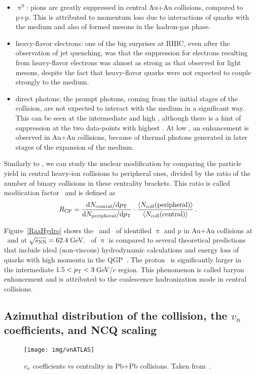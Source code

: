 \begin{itemize}
 \item $\uppi^0$: pions are greatly suppressed in central Au+Au collisions, compared to p+p. This is attributed to momentum loss due to interactions of quarks with the medium and also of formed mesons in the hadron-gas phase.
 \item heavy-flavor electrons: one of the big surprises at RHIC, even after the observation of jet
quenching, was that the suppression for electrons resulting from heavy-flavor electrons was almost as strong as that observed
for light mesons, despite the fact that heavy-flavor quarks were not expected to couple
strongly to the medium.
 \item direct photons: the prompt photons, coming from the initial stages of the collision, are not expected to interact with the medium in a significant way. This can be seen at the intermediate and high \pt, although there is a hint of suppression at the two data-points with highest \pt\@. At low \pt, an enhancement is observed in Au+Au collisions, because of thermal photons generated in later stages of the expansion of the medium.
\end{itemize}

Similarly to \Raa, we can study the nuclear modification by comparing the particle yield in central heavy-ion collisions to peripheral ones, divided by the ratio of the number of binary collisions in these centrality brackets. This ratio is called modiication factor \Rcp\ and is defined as
\begin{equation}
 R_\text{CP} = \frac{\mathrm{d} N_\mathrm{central}/\mathrm{d} {p_{\mathrm{T}}}}
{\mathrm{d} N_\mathrm{peripheral}/\mathrm{d} {p_{\mathrm{T}}}} \cdot
\frac{\langle N_\mathrm{coll} (\text{peripheral}) \rangle}
{\langle N_\mathrm{coll} (\text{central}) \rangle}\,.
\end{equation}

Figure~\ref{RaaHydro} shows the \Raa\ and \Rcp\ of identified $\uppi$ and p in Au+Au collisions at \snnFull\ and at $\sqrt{s_\text{NN}} = 62.4\,$GeV\@. \Raa\ of $\uppi$ is compared to several theoretical predictions that include ideal (non-viscous) hydrodynamic calculations and energy loss of quarks with high momenta in the QGP~\cite{Alam, Wang, Vitev}\@. The proton \Rcp\ is significantly larger in the intermediate $1.5 < {p_{\mathrm{T}}} < 3\,$GeV/$c$ region. This phenomenon is called baryon enhancement and is attributed to the coalescence hadronization mode in central collisions.



\subsection{Azimuthal distribution of the collision, the $v_n$ coefficients, and NCQ scaling}
\begin{figure}[!htb]
\centering
\texttt{[image: img/vnATLAS]}
\caption[$v_n$ coefficients vs centrality in Pb+Pb collisions.]{\label{vnATLAS}$v_n$ coefficients vs centrality in Pb+Pb collisions. Taken from~\cite{vnATLAS}\@.}

\end{figure}

